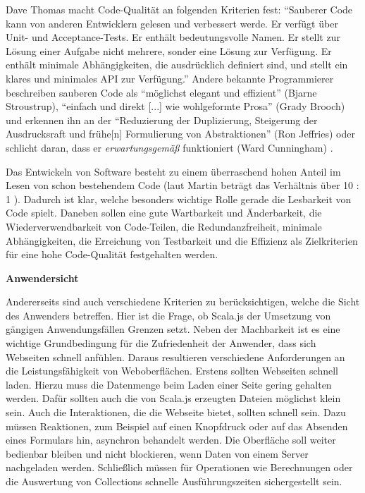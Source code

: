 \documentclass[a4paper, 12pt, hidelinks, listof=totoc, listoftables=totoc, bibliography=totoc]{scrreprt}
\newcommand{\MyMiniSec}[1]{\rmfamily\fontsize{12}{15}\selectfont
	\vspace{7pt}\textbf{#1} %
}
\begin{document}
Dave Thomas macht Code-Qualität an folgenden Kriterien fest: "`Sauberer Code kann von anderen Entwicklern gelesen und verbessert werde. Er verfügt über Unit- und Acceptance-Tests. Er enthält bedeutungsvolle Namen. Er stellt zur Lösung einer Aufgabe nicht mehrere, sonder eine Lösung zur Verfügung. Er enthält minimale Abhängigkeiten, die ausdrücklich definiert sind, und stellt ein klares und minimales API zur Verfügung."' \cite[zit. nach: ][S. 35]{martin2009.CCH} Andere bekannte Programmierer beschreiben sauberen Code als "`möglichst elegant und effizient"' (Bjarne Stroustrup), "`einfach und direkt [...] wie wohlgeformte Prosa"' (Grady Brooch) und erkennen ihn an der "`Reduzierung der Duplizierung, Steigerung der Ausdrucksraft und frühe[n] Formulierung von Abstraktionen"' (Ron Jeffries) oder schlicht daran, dass er \emph{erwartungsgemäß} funktioniert (Ward Cunningham) \cite[alle zit. nach: ][S. 32 ff.]{martin2009.CCH}.

Das Entwickeln von Software besteht zu einem überraschend hohen Anteil im Lesen von schon bestehendem Code (laut Martin beträgt das Verhältnis über 10 : 1 \cite[S.~42]{martin2009.CCH}). Dadurch ist klar, welche besonders wichtige Rolle gerade die Lesbarkeit von Code spielt. Daneben sollen eine gute Wartbarkeit und Änderbarkeit, die Wiederverwendbarkeit von Code-Teilen, die Redundanzfreiheit, minimale Abhängigkeiten, die Erreichung von Testbarkeit und die Effizienz als Zielkriterien für eine hohe Code-Qualität festgehalten werden.

\MyMiniSec{Anwendersicht}

Andererseits sind auch verschiedene Kriterien zu berücksichtigen, welche die Sicht des Anwenders betreffen. Hier ist die Frage, ob Scala.js der Umsetzung von gängigen Anwendungsfällen Grenzen setzt. Neben der Machbarkeit ist es eine wichtige Grundbedingung für die Zufriedenheit der Anwender, dass sich Webseiten schnell anfühlen. Daraus resultieren verschiedene Anforderungen an die Leistungsfähigkeit von Weboberflächen. Erstens sollten Webseiten schnell laden. Hierzu muss die Datenmenge beim Laden einer Seite gering gehalten werden. Dafür sollten auch die von Scala.js erzeugten Dateien möglichst klein sein. Auch die Interaktionen, die die Webseite bietet, sollten schnell sein. Dazu müssen Reaktionen, zum Beispiel auf einen Knopfdruck oder auf das Absenden eines Formulars hin, asynchron behandelt werden. Die Oberfläche soll weiter bedienbar bleiben und nicht blockieren, wenn Daten von einem Server nachgeladen werden. Schließlich müssen für Operationen wie Berechnungen oder die Auswertung von Collections schnelle Ausführungszeiten sichergestellt sein.
\end{document}

